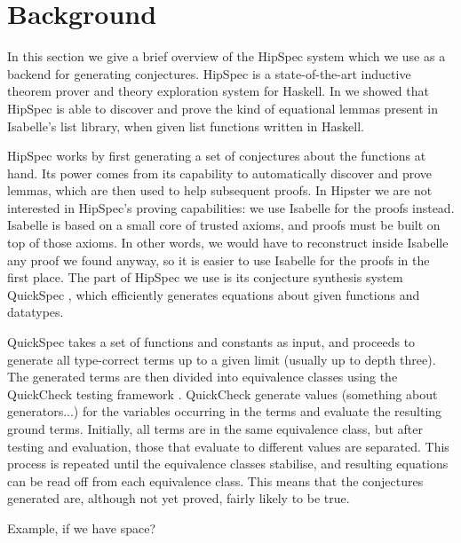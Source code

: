 \section{Background}
\label{sec:background}

In this section we give a brief overview of the HipSpec system which
we use as a backend for generating conjectures. HipSpec is a
state-of-the-art inductive theorem prover and theory exploration
system for Haskell. In \cite{hipspecCADE} we showed that HipSpec is
able to discover and prove the kind of equational lemmas present in
Isabelle's list library, when given list functions written in Haskell.

HipSpec works by first generating a set of conjectures about the
functions at hand. Its power comes from its capability to
automatically discover and prove lemmas, which are then used to help
subsequent proofs. In Hipster we are not interested in HipSpec's
proving capabilities: we use Isabelle for the proofs instead. Isabelle
is based on a small core of trusted axioms, and proofs must be built
on top of those axioms. In other words, we would have to reconstruct
inside Isabelle any proof we found anyway, so it is easier to use
Isabelle for the proofs in the first place. The part of HipSpec we use
is its conjecture synthesis system QuickSpec \cite{quickspec},
which efficiently generates equations about given functions and
datatypes.



QuickSpec takes a set of functions and constants as input, and proceeds to generate all type-correct terms up to a given limit (usually up to depth three). The generated terms are then divided into equivalence classes using the QuickCheck testing framework \cite{quickcheck}. QuickCheck generate values (something about generators...) for the variables occurring in the terms and evaluate the resulting ground terms.  Initially, all terms are in the same equivalence class, but after testing and evaluation, those that evaluate to different values are separated. This process is repeated until the equivalence classes stabilise, and resulting equations can be read off from each equivalence class. This means that the conjectures generated are, although not yet proved, fairly likely to be true.

Example, if we have space? 
